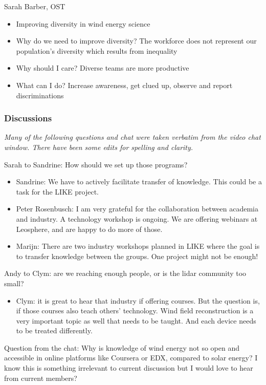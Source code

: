 Sarah Barber, OST

\begin{itemize}
	\item Improving diversity in wind energy science
	\item Why do we need to improve diversity? The workforce does not represent our population's diversity which results from inequality
	\item Why should I care? Diverse teams are more productive
	\item What can I do? Increase awareness, get clued up, observe and report discriminations
\end{itemize}

\subsubsection{Discussions}

\emph{Many of the following questions and chat were taken verbatim from the video chat window. There have been some edits for spelling and clarity.}

Sarah to Sandrine: How should we set up those programs?

\begin{itemize}
	\item Sandrine: We have to actively facilitate transfer of knowledge. This could be a task for the LIKE project.
	\item Peter Rosenbusch: I am very grateful for the collaboration between academia and industry. A technology workshop is ongoing. We are offering webinars at Leosphere, and are happy to do more of those.
	\item Marijn: There are two industry workshops planned in LIKE where the goal is to transfer knowledge between the groups. One project might not be enough!
\end{itemize}

Andy to Clym: are we reaching enough people, or is the lidar community too small?

\begin{itemize}
	\item Clym: it is great to hear that industry if offering courses. But the question is, if those courses also teach others' technology. Wind field reconstruction is a very important topic as well that needs to be taught. And each device needs to be treated differently.
\end{itemize}

Question from the chat: Why is knowledge of wind energy not so open and accessible in online platforms like Coursera or EDX, compared to solar energy? I know this is something irrelevant to current discussion but I would love to hear from current members?

